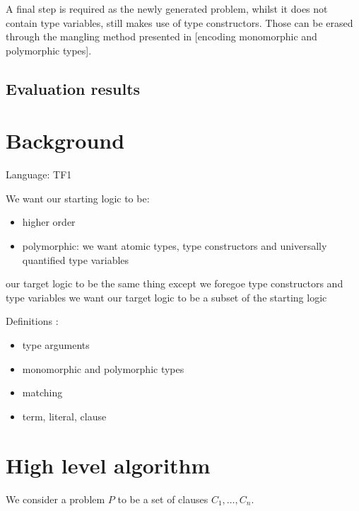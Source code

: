 \documentclass[]{ceurart}
\begin{document}
A final step is required as the newly generated problem, whilst it does not contain type variables, still makes use of type constructors. Those can be erased through the mangling method presented in [encoding monomorphic and polymorphic types].


\subsection{Evaluation results}


\section{Background}


Language: TF1  %

We want our starting logic to be:
\begin{itemize}
    \item higher order
    \item polymorphic: we want atomic types, type constructors and universally quantified type variables
\end{itemize}
our target logic to be the same thing except we foregoe type constructors and type variables 
we want our target logic to be a subset of the starting logic


Definitions :
\begin{itemize}
   \item type arguments %
   \item monomorphic and polymorphic types
   \item matching %
   \item term, literal, clause  %
\end{itemize}

\section{High level algorithm}

We consider a problem \(P\) to be a set of clauses \(C_1, \dots, C_n\).
\end{document}
